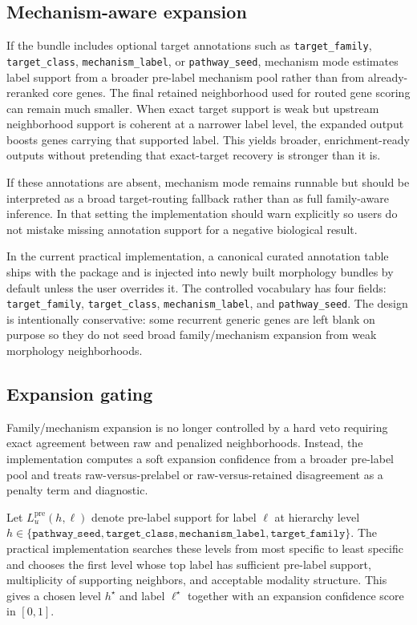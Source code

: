 \documentclass[11pt]{article}
\begin{document}
\subsection{Mechanism-aware expansion}
If the bundle includes optional target annotations such as \texttt{target\_family}, \texttt{target\_class}, \texttt{mechanism\_label}, or \texttt{pathway\_seed}, mechanism mode estimates label support from a broader pre-label mechanism pool rather than from already-reranked core genes. The final retained neighborhood used for routed gene scoring can remain much smaller. When exact target support is weak but upstream neighborhood support is coherent at a narrower label level, the expanded output boosts genes carrying that supported label. This yields broader, enrichment-ready outputs without pretending that exact-target recovery is stronger than it is.

If these annotations are absent, mechanism mode remains runnable but should be interpreted as a broad target-routing fallback rather than as full family-aware inference. In that setting the implementation should warn explicitly so users do not mistake missing annotation support for a negative biological result.

In the current practical implementation, a canonical curated annotation table ships with the package and is injected into newly built morphology bundles by default unless the user overrides it. The controlled vocabulary has four fields:
\texttt{target\_family}, \texttt{target\_class}, \texttt{mechanism\_label}, and \texttt{pathway\_seed}. The design is intentionally conservative: some recurrent generic genes are left blank on purpose so they do not seed broad family/mechanism expansion from weak morphology neighborhoods.

\subsection{Expansion gating}
Family/mechanism expansion is no longer controlled by a hard veto requiring exact agreement between raw and penalized neighborhoods. Instead, the implementation computes a soft expansion confidence from a broader pre-label pool and treats raw-versus-prelabel or raw-versus-retained disagreement as a penalty term and diagnostic.

Let $L_u^{\mathrm{pre}}(h,\ell)$ denote pre-label support for label $\ell$ at hierarchy level $h \in \{\texttt{pathway\_seed}, \texttt{target\_class}, \texttt{mechanism\_label}, \texttt{target\_family}\}$. The practical implementation searches these levels from most specific to least specific and chooses the first level whose top label has sufficient pre-label support, multiplicity of supporting neighbors, and acceptable modality structure. This gives a chosen level $h^\star$ and label $\ell^\star$ together with an expansion confidence score in $[0,1]$.
\end{document}
